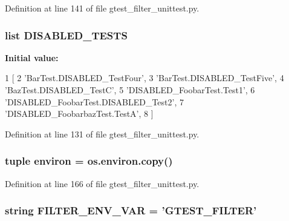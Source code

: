 \-Definition at line 141 of file gtest\-\_\-filter\-\_\-unittest.\-py.

\hypertarget{namespacegtest__filter__unittest_ac22e00ec6657e8cf7ceaf3f4dcf5c483}{
\subsubsection[{\-D\-I\-S\-A\-B\-L\-E\-D\-\_\-\-T\-E\-S\-T\-S}]{\setlength{\rightskip}{0pt plus 5cm}list {\bf \-D\-I\-S\-A\-B\-L\-E\-D\-\_\-\-T\-E\-S\-T\-S}}}\label{d5/dea/namespacegtest__filter__unittest_ac22e00ec6657e8cf7ceaf3f4dcf5c483}
{\bfseries \-Initial value\-:}
\begin{DoxyCode}
1 [
2     'BarTest.DISABLED_TestFour',
3     'BarTest.DISABLED_TestFive',
4     'BazTest.DISABLED_TestC',
5     'DISABLED_FoobarTest.Test1',
6     'DISABLED_FoobarTest.DISABLED_Test2',
7     'DISABLED_FoobarbazTest.TestA',
8     ]
\end{DoxyCode}


\-Definition at line 131 of file gtest\-\_\-filter\-\_\-unittest.\-py.

\hypertarget{namespacegtest__filter__unittest_a199b463c0623b1b68e7b45e7b01fe16c}{
\subsubsection[{environ}]{\setlength{\rightskip}{0pt plus 5cm}tuple {\bf environ} = os.\-environ.\-copy()}}\label{d5/dea/namespacegtest__filter__unittest_a199b463c0623b1b68e7b45e7b01fe16c}


\-Definition at line 166 of file gtest\-\_\-filter\-\_\-unittest.\-py.

\hypertarget{namespacegtest__filter__unittest_a7350585160a9ce9ec6e3f65bc8d8d79e}{
\subsubsection[{\-F\-I\-L\-T\-E\-R\-\_\-\-E\-N\-V\-\_\-\-V\-A\-R}]{\setlength{\rightskip}{0pt plus 5cm}string {\bf \-F\-I\-L\-T\-E\-R\-\_\-\-E\-N\-V\-\_\-\-V\-A\-R} = '\-G\-T\-E\-S\-T\-\_\-\-F\-I\-L\-T\-E\-R'}}\label{d5/dea/namespacegtest__filter__unittest_a7350585160a9ce9ec6e3f65bc8d8d79e}


